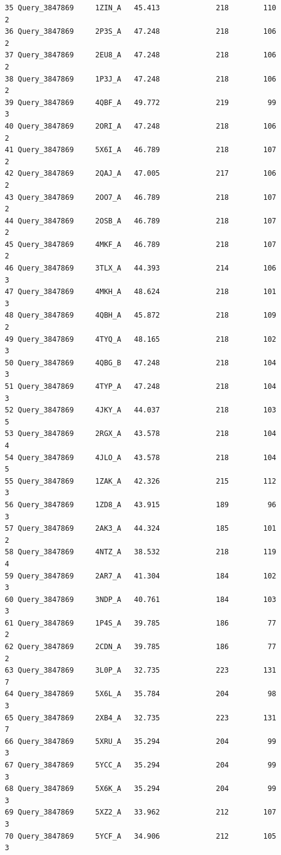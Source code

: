 \documentclass[
  letterpaper,
  DIV=11,
  numbers=noendperiod]{scrartcl}
\begin{document}
\begin{verbatim}
35 Query_3847869     1ZIN_A   45.413             218        110        2
36 Query_3847869     2P3S_A   47.248             218        106        2
37 Query_3847869     2EU8_A   47.248             218        106        2
38 Query_3847869     1P3J_A   47.248             218        106        2
39 Query_3847869     4QBF_A   49.772             219         99        3
40 Query_3847869     2ORI_A   47.248             218        106        2
41 Query_3847869     5X6I_A   46.789             218        107        2
42 Query_3847869     2QAJ_A   47.005             217        106        2
43 Query_3847869     2OO7_A   46.789             218        107        2
44 Query_3847869     2OSB_A   46.789             218        107        2
45 Query_3847869     4MKF_A   46.789             218        107        2
46 Query_3847869     3TLX_A   44.393             214        106        3
47 Query_3847869     4MKH_A   48.624             218        101        3
48 Query_3847869     4QBH_A   45.872             218        109        2
49 Query_3847869     4TYQ_A   48.165             218        102        3
50 Query_3847869     4QBG_B   47.248             218        104        3
51 Query_3847869     4TYP_A   47.248             218        104        3
52 Query_3847869     4JKY_A   44.037             218        103        5
53 Query_3847869     2RGX_A   43.578             218        104        4
54 Query_3847869     4JLO_A   43.578             218        104        5
55 Query_3847869     1ZAK_A   42.326             215        112        3
56 Query_3847869     1ZD8_A   43.915             189         96        3
57 Query_3847869     2AK3_A   44.324             185        101        2
58 Query_3847869     4NTZ_A   38.532             218        119        4
59 Query_3847869     2AR7_A   41.304             184        102        3
60 Query_3847869     3NDP_A   40.761             184        103        3
61 Query_3847869     1P4S_A   39.785             186         77        2
62 Query_3847869     2CDN_A   39.785             186         77        2
63 Query_3847869     3L0P_A   32.735             223        131        7
64 Query_3847869     5X6L_A   35.784             204         98        3
65 Query_3847869     2XB4_A   32.735             223        131        7
66 Query_3847869     5XRU_A   35.294             204         99        3
67 Query_3847869     5YCC_A   35.294             204         99        3
68 Query_3847869     5X6K_A   35.294             204         99        3
69 Query_3847869     5XZ2_A   33.962             212        107        3
70 Query_3847869     5YCF_A   34.906             212        105        3

\end{verbatim}
\end{document}
